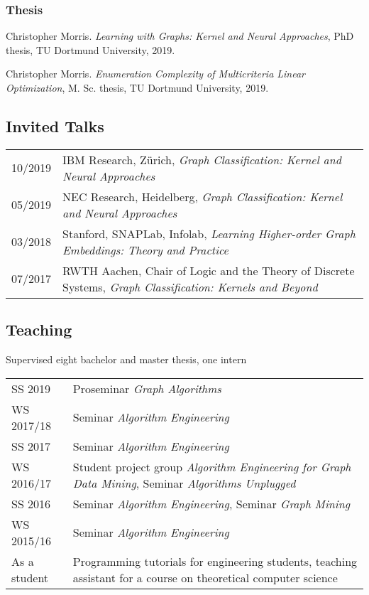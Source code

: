 \documentclass[11pt, a4paper]{scrartcl}
\begin{document}
\begin{thebibliography}{5}
\subsubsection*{Thesis}

Christopher Morris.
\emph{Learning with Graphs: Kernel and Neural Approaches}, PhD thesis, TU Dortmund University, 2019.

Christopher Morris.
\emph{Enumeration Complexity of Multicriteria Linear Optimization}, M. Sc. thesis, TU Dortmund University, 2019.

	
\end{thebibliography}

\subsection*{Invited Talks}
\begin{tabular}{p{2.1cm}p{12.0cm}}
10/2019&IBM Research, Zürich, \emph{Graph Classification: Kernel and Neural Approaches}\\
05/2019&NEC Research, Heidelberg, \emph{Graph Classification: Kernel and Neural Approaches}\\ 
03/2018&Stanford, SNAPLab, Infolab, \emph{Learning Higher-order Graph Embeddings: Theory and Practice}\\
07/2017&RWTH Aachen, Chair of Logic and the Theory of Discrete Systems, \emph{Graph Classification: Kernels and Beyond}\\

\end{tabular}





\subsection*{Teaching}

Supervised eight bachelor and master thesis, one intern\\

\begin{tabular}{p{3.1cm}p{12.0cm}}
SS 2019&Proseminar \emph{Graph Algorithms}\\
WS 2017/18&Seminar \emph{Algorithm Engineering}\\
SS 2017&Seminar \emph{Algorithm Engineering}\\
WS 2016/17&Student project group \emph{Algorithm Engineering for Graph Data Mining}, Seminar \emph{Algorithms Unplugged}\\
SS 2016&Seminar \emph{Algorithm Engineering}, Seminar \emph{Graph Mining}\\
WS 2015/16& Seminar \emph{Algorithm Engineering}\\
As a student& Programming tutorials for engineering students, teaching assistant for a course on theoretical computer science\\
\end{tabular}
\end{document}
